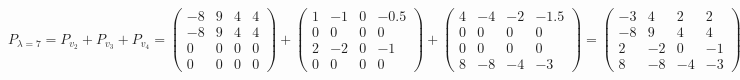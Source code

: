 \documentclass{article}
\begin{document}
$$P_{\lambda=7} = P_{v_2} + P_{v_3} + P_{v_4} = \begin{pmatrix}
-8 & 9 & 4 & 4 \\
-8 & 9 & 4 & 4 \\
0 & 0 & 0 & 0 \\
0 & 0 & 0 & 0
\end{pmatrix} +  \begin{pmatrix}
1 & -1 & 0 & -0.5 \\
0 & 0 & 0 & 0 \\
2 & -2 & 0 & -1 \\
0 & 0 & 0 & 0
\end{pmatrix} + \begin{pmatrix}
4 & -4 & -2 & -1.5 \\
0 & 0 &0 & 0 \\
0 & 0 &0 & 0 \\
8 & -8 & -4 & -3
\end{pmatrix} = \begin{pmatrix}
-3 & 4 & 2 & 2\\
-8 & 9 & 4 &  4 \\
2 & -2 & 0 & -1 \\
8 & -8 & -4 & -3
\end{pmatrix}$$
\end{document}
